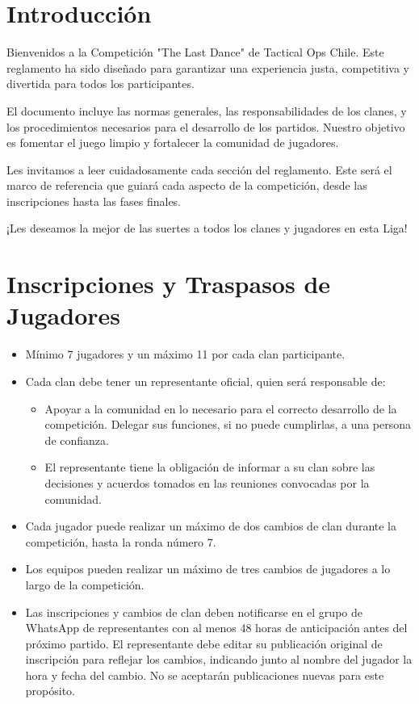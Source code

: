 \documentclass[a4paper, 11pt]{article}
\begin{document}
    
     \section{Introducción}
     Bienvenidos a la Competición "The Last Dance" de Tactical Ops Chile. Este reglamento ha sido diseñado para garantizar una experiencia justa, competitiva y divertida para todos los participantes.

    El documento incluye las normas generales, las responsabilidades de los clanes, y los procedimientos necesarios para el desarrollo de los partidos. Nuestro objetivo es fomentar el juego limpio y fortalecer la comunidad de jugadores.

    Les invitamos a leer cuidadosamente cada sección del reglamento. Este será el marco de referencia que guiará cada aspecto de la competición, desde las inscripciones hasta las fases finales.

    ¡Les deseamos la mejor de las suertes a todos los clanes y jugadores en esta Liga!
    \clearpage

    \section{Inscripciones y Traspasos de Jugadores}
    
    \begin{itemize}
        \item Mínimo 7 jugadores y un máximo 11 por cada clan participante.
        \item Cada clan debe tener un representante oficial, quien será responsable de:
        \begin{itemize}
            \item Apoyar a la comunidad en lo necesario para el correcto desarrollo de la competición.
            Delegar sus funciones, si no puede cumplirlas, a una persona de confianza.
            \item El representante tiene la obligación de informar a su clan sobre las decisiones y acuerdos tomados en las reuniones convocadas por la comunidad.
        \end{itemize} 
                
        \item Cada jugador puede realizar un máximo de dos cambios de clan durante la competición, hasta la ronda número 7.
        \item Los equipos pueden realizar un máximo de tres cambios de jugadores a lo largo de la competición.
        \item Las inscripciones y cambios de clan deben notificarse en el grupo de WhatsApp de representantes con al menos 48 horas de anticipación antes del próximo partido.
        El representante debe editar su publicación original de inscripción para reflejar los cambios, indicando junto al nombre del jugador la hora y fecha del cambio. No se aceptarán publicaciones nuevas para este propósito.
      \end{itemize}
    \clearpage
\end{document}
